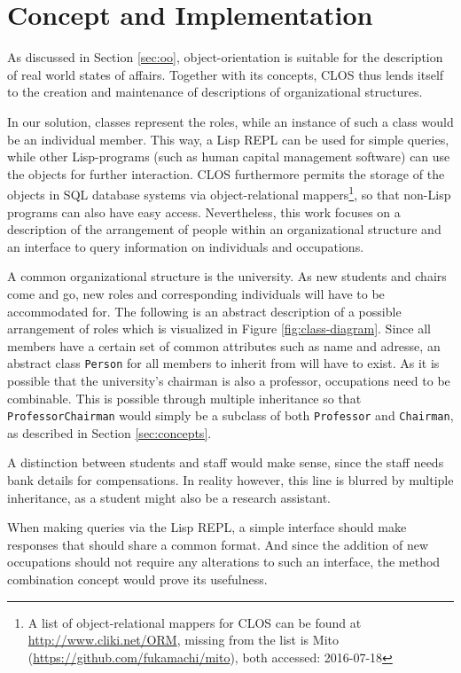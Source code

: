 \documentclass[oribibl]{llncs}
\begin{document}
\section{Concept and Implementation}
\label{sec:approach}

As discussed in Section \ref{sec:oo}, object-orientation is suitable for the description of real world states of affairs. Together with its concepts, CLOS thus lends itself to the creation and maintenance of descriptions of organizational structures.

In our solution, classes represent the roles, while an instance of such a class would be an individual member. This way, a Lisp REPL can be used for simple queries, while other Lisp-programs (such as human capital management software) can use the objects for further interaction. CLOS furthermore permits the storage of the objects in SQL database systems via object-relational mappers\footnote{A list of object-relational mappers for CLOS can be found at \url{http://www.cliki.net/ORM}, missing from the list is Mito (\url{https://github.com/fukamachi/mito}), both accessed: 2016-07-18}, so that non-Lisp programs can also have easy access. Nevertheless, this work focuses on a description of the arrangement of people within an organizational structure and  an interface to query information on individuals and occupations.
\newline

A common organizational structure is the university. As new students and chairs come and go, new roles and corresponding individuals will have to be accommodated for. The following is an abstract description of a possible arrangement of roles which is visualized in Figure \ref{fig:class-diagram}. Since all members have a certain set of common attributes such as name and adresse, an abstract class \texttt{Person} for all members to inherit from will have to exist. As it is possible that the university's chairman is also a professor, occupations need to be combinable. This is possible through multiple inheritance so that \texttt{ProfessorChairman} would simply be a subclass of both \texttt{Professor} and \texttt{Chairman}, as described in Section \ref{sec:concepts}. 

A distinction between students and staff would make sense, since the staff needs bank details for compensations. In reality however, this line is blurred by multiple inheritance, as a student might also be a research assistant.

When making queries via the Lisp REPL, a simple interface should make responses that should share a common format. And since the addition of new occupations should not require any alterations to such an interface, the method combination concept would prove its usefulness. 
\end{document}
